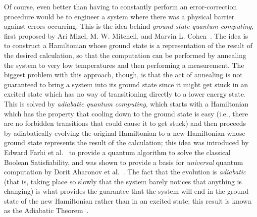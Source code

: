 \documentclass[12pt]{amsbook}
\theoremstyle{plain}
\theoremstyle{definition}
\theoremstyle{remark}
\begin{document}
Of course, even better than having to constantly perform an error-correction procedure would be to engineer a system where there was a physical barrier against errors occurring.  This is the idea behind \emph{ground state quantum computing}, first proposed by Ari Mizel, M. W. Mitchell, and Marvin L. Cohen~\cite{PhysRevA.63.040302}.  The idea is to construct a Hamiltonian whose ground state is a representation of the result of the desired calculation, so that the computation can be performed by annealing the system to very low temperatures and then performing a measurement.  The biggest problem with this approach, though, is that the act of annealing is not guaranteed to bring a system into its ground state since it might get stuck in an excited state which has no way of transitioning directly to a lower energy state.  This is solved by \emph{adiabatic quantum computing}, which starts with a Hamiltonian which has the property that cooling down to the ground state is easy (i.e., there are no forbidden transitions that could cause it to get stuck) and then proceeds by adiabatically evolving the original Hamiltonian to a new Hamiltonian whose ground state represents the result of the calculation;  this idea was introduced by Edward Farhi et al.~\cite{Farhi2000} to provide a quantum algorithm to solve the classical Boolean Satisfiability, and was shown to provide a basis for \emph{universal} quantum computation by Dorit Aharonov et al.~\cite{Aharonov2007}.  The fact that the evolution is \emph{adiabatic} (that is, taking place so slowly that the system barely notices that anything is changing) is what provides the guarantee that the system will end in the ground state of the new Hamiltonian rather than in an excited state;  this result is known as the Adiabatic Theorem~\cite{JPSJ.5.435}.
\end{document}
